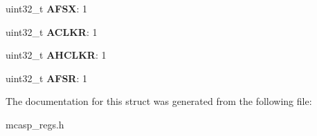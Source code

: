 \begin{DoxyCompactItemize}
\item 
\hypertarget{structMCASP__PFUNC_aa13e2128929a97e5f7d61a58e42ba09e}{uint32\-\_\-t {\bfseries A\-F\-S\-X}\-: 1}\label{structMCASP__PFUNC_aa13e2128929a97e5f7d61a58e42ba09e}

\item 
\hypertarget{structMCASP__PFUNC_a1c3010580f68d92cb7cc5ea78b84af2e}{uint32\-\_\-t {\bfseries A\-C\-L\-K\-R}\-: 1}\label{structMCASP__PFUNC_a1c3010580f68d92cb7cc5ea78b84af2e}

\item 
\hypertarget{structMCASP__PFUNC_a2cb6e3c81253f3a6f5cdb1db28cc627d}{uint32\-\_\-t {\bfseries A\-H\-C\-L\-K\-R}\-: 1}\label{structMCASP__PFUNC_a2cb6e3c81253f3a6f5cdb1db28cc627d}

\item 
\hypertarget{structMCASP__PFUNC_a2cb08d713ecc7154e4b1c5f9ef1ad25c}{uint32\-\_\-t {\bfseries A\-F\-S\-R}\-: 1}\label{structMCASP__PFUNC_a2cb08d713ecc7154e4b1c5f9ef1ad25c}

\end{DoxyCompactItemize}


The documentation for this struct was generated from the following file\-:\begin{DoxyCompactItemize}
\item 
mcasp\-\_\-regs.\-h\end{DoxyCompactItemize}
